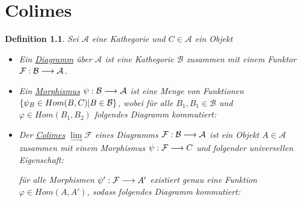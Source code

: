 \documentclass[10pt,a4paper]{report}
\newcommand{\comment}[1]{}
\newcounter{Aussage}[chapter]
\newtheorem{definition}[Aussage]{Definition}
\newcommand{\functionfront}[3]{\nolinebreak{#1:#2 \longrightarrow #3}}
\newcommand{\colimes}[0]{\lim\limits_{ \longrightarrow }}
\begin{document}
\chapter{Colimes}
\comment
{}
\begin{definition}
Sei $\mathcal{A}$ eine Kathegorie und $C \in \mathcal{A}$ ein Objekt
\begin{itemize}
\item Ein \underline{Diagramm} über $\mathcal{A}$ ist eine Kathegorie $\mathcal{B}$ zusammen mit einem Funktor $\functionfront{\mathcal{F}}{\mathcal{B}}{\mathcal{A}}$.
\item Ein \underline{Morphismus} $\functionfront{\psi}{\mathcal{B}}{\mathcal{A}}$ ist eine Menge von Funktionen 
$\nolinebreak{\lbrace \psi_B \in Hom(B,C) \vert B \in \mathcal{B} \rbrace}$, wobei für alle $B_1,B_1 \in \mathcal{B}$ und $\varphi \in Hom(B_1,B_2)$ folgendes Diagramm kommutiert:
\begin{center}
\end{center}
\item Der \underline{Colimes} $\colimes \mathcal{F}$ eines Diagramms $\functionfront{\mathcal{F}}{\mathcal{B}}{\mathcal{A}}$ ist ein Objekt $A \in \mathcal{A}$ zusammen mit einem Morphismus $\functionfront{\psi}{\mathcal{F}}{C}$ und folgender universellen Eigenschaft:
\begin{center}
\comment{$\forall Morphismen \functionfront{\psi '}{\mathcal{F}}{\mathcal{A}'}\exists ! \varphi \in Hom_{\mathcal{A}}(A,A') \forall B \in \mathcal{B}: \varphi \circ \psi_B = \psi'_B $}

für alle Morphismen $\functionfront{\psi '}{\mathcal{F}}{A'}$ existiert genau eine Funktion $\varphi \in Hom(A,A')$, sodass folgendes Diagramm kommutiert:
\end{center}

\end{itemize}
\end{definition}
\end{document}
